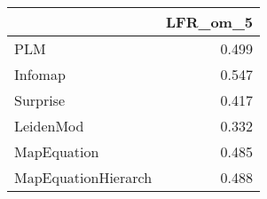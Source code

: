 \begin{tabular}{lr}
\toprule
{} & LFR_om_5 \\
\midrule
PLM                 &    0.499 \\
Infomap             &    0.547 \\
Surprise            &    0.417 \\
LeidenMod           &    0.332 \\
MapEquation         &    0.485 \\
MapEquationHierarch &    0.488 \\
\bottomrule
\end{tabular}
